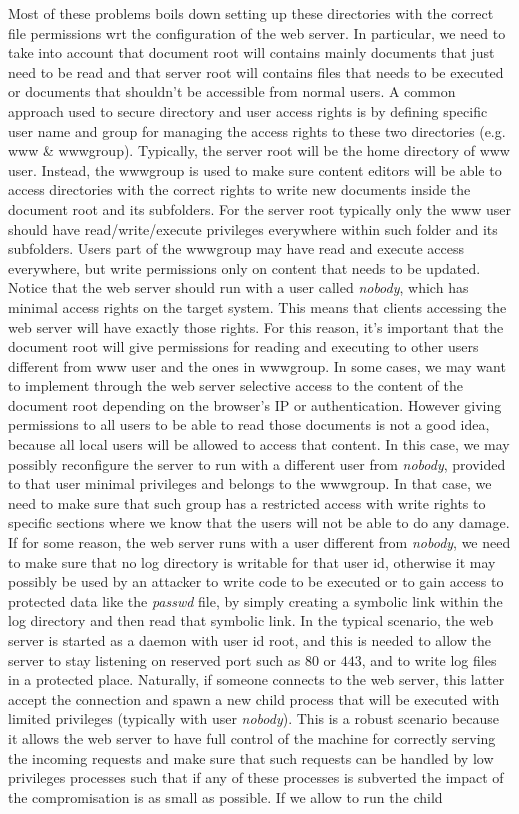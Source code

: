 Most of these problems boils down setting up these directories with the correct file permissions wrt the configuration of the web server. In particular, we need to take into account that document root will contains mainly documents that just need to be read and that server root will contains files that needs to be executed or documents that shouldn't be accessible from normal users. A common approach used to secure directory and user access rights is by defining specific user name and group for managing the access rights to these two directories (e.g. www \& wwwgroup). Typically, the server root will be the home directory of www user. Instead, the wwwgroup is used to make sure content editors will be able to access directories with the correct rights to write new documents inside the document root and its subfolders. For the server root typically only the www user should have read/write/execute privileges everywhere within such folder and its subfolders. Users part of the wwwgroup may have read and execute access everywhere, but write permissions only on content that needs to be updated. Notice that the web server should run with a user called \textit{nobody}, which has minimal access rights on the target system. This means that clients accessing the web server will have exactly those rights. For this reason, it's important that the document root will give permissions for reading and executing to other users different from www user and the ones in wwwgroup. In some cases, we may want to implement through the web server selective access to the content of the document root depending on the browser's IP or authentication. However giving permissions to all users to be able to read those documents is not a good idea, because all local users will be allowed to access that content. In this case, we may possibly reconfigure the server to run with a different user from \textit{nobody}, provided to that user minimal privileges and belongs to the wwwgroup. In that case, we need to make sure that such group has a restricted access with write rights to specific sections where we know that the users will not be able to do any damage. If for some reason, the web server runs with a user different from \textit{nobody}, we need to make sure that no log directory is writable for that user id, otherwise it may possibly be used by an attacker to write code to be executed or to gain access to protected data like the \textit{passwd} file, by simply creating a symbolic link within the log directory and then read that symbolic link. In the typical scenario, the web server is started as a daemon with user id root, and this is needed to allow the server to stay listening on reserved port such as $80$ or $443$, and to write log files in a protected place. Naturally, if someone connects to the web server, this latter accept the connection and spawn a new child process that will be executed with limited privileges (typically with user \textit{nobody}). This is a robust scenario because it allows the web server to have full control of the machine for correctly serving the incoming requests and make sure that such requests can be handled by low privileges processes such that if any of these processes is subverted the impact of the compromisation is as small as possible. If we allow to run the child 